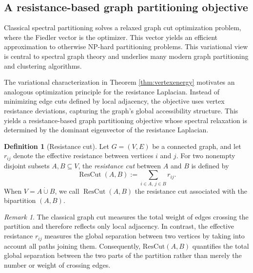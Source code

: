 \documentclass[12pt,a4paper]{amsart}
\theoremstyle{remark}
\newtheorem{remark}[theorem]{Remark}
\theoremstyle{definition}
\newtheorem{definition}[theorem]{Definition}
\newcommand{\1}{\mathbf{1}}
\newcommand{\0}{\mathbf{0}}
\begin{document}
\subsection{A resistance-based graph partitioning objective}

Classical spectral partitioning solves a relaxed graph cut optimization problem, where the Fiedler vector is the optimizer. This vector yields an efficient approximation to otherwise NP-hard partitioning problems. This variational view is central to spectral graph theory and underlies many modern graph partitioning and clustering algorithms.

The variational characterization in Theorem \ref{thm:vertexenergy} motivates an analogous optimization principle for the resistance Laplacian. 
Instead of minimizing edge cuts defined by local adjacency, the objective uses vertex resistance deviations, capturing the graph’s global accessibility structure. 
This yields a resistance-based graph partitioning objective whose spectral relaxation is determined by the dominant eigenvector of the resistance Laplacian.

    
	\begin{definition}[Resistance cut]
Let $G=(V,E)$ be a connected graph, and let $r_{ij}$ denote the
effective resistance between vertices $i$ and $j$. For two nonempty
disjoint subsets $A,B\subseteq V$, the \emph{resistance cut} between
$A$ and $B$ is defined by
\[
\operatorname{ResCut}(A,B)
:=
\sum_{{i\in A,\,j\in B}} r_{ij}.
\]
When $V=A\mathbin{\dot\cup}B$, we call
$\operatorname{ResCut}(A,B)$ the resistance cut associated with the
bipartition $(A,B)$.
\end{definition}
	\begin{remark}
The classical graph cut measures the total weight of edges crossing the partition and therefore reflects only local adjacency. 
In contrast, the effective resistance $r_{ij}$ measures the global separation between two vertices by taking into account all paths joining them.
Consequently, $\mathrm{ResCut}(A, B)$ quantifies the total global separation between the two parts of the partition rather than merely the number or weight of crossing edges.
  \end{remark}
\end{document}
